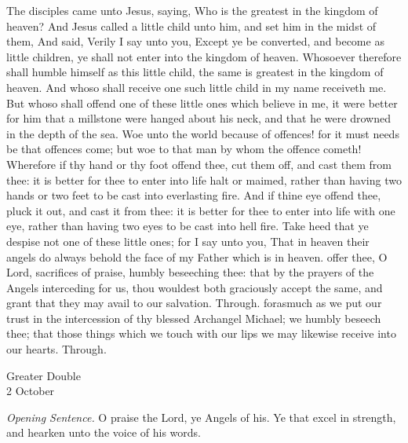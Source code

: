  The disciples came unto Jesus, saying, Who is the greatest in the kingdom of heaven? And Jesus called a little child unto him, and set him in the midst of them, And said, Verily I say unto you, Except ye be converted, and become as little children, ye shall not enter into the kingdom of heaven. Whosoever therefore shall humble himself as this little child, the same is greatest in the kingdom of heaven. And whoso shall receive one such little child in my name receiveth me. But whoso shall offend one of these little ones which believe in me, it were better for him that a millstone were hanged about his neck, and that he were drowned in the depth of the sea. Woe unto the world because of offences! for it must needs be that offences come; but woe to that man by whom the offence cometh! Wherefore if thy hand or thy foot offend thee, cut them off, and cast them from thee: it is better for thee to enter into life halt or maimed, rather than having two hands or two feet to be cast into everlasting fire. And if thine eye offend thee, pluck it out, and cast it from thee: it is better for thee to enter into life with one eye, rather than having two eyes to be cast into hell fire. Take heed that ye despise not one of these little ones; for I say unto you, That in heaven their angels do always behold the face of my Father which is in heaven.
\secret
{} offer thee, O Lord, sacrifices of praise, humbly beseeching thee: that by the prayers of the Angels interceding for us, thou wouldest both graciously accept the same, and grant that they may avail to our salvation. Through.
\postcommunion
{} forasmuch as we put our trust in the intercession of thy blessed Archangel Michael; we humbly beseech thee; that those things which we touch with our lips we may likewise receive into our hearts. Through.


\begin{inhead}
	{Greater Double\\
		2 October}
\end{inhead}
\par\noindent
\textit{Opening Sentence.} O praise the Lord, ye Angels of his. Ye that excel in strength, and hearken unto the voice of his words.
\par\noindent
{}
\par\noindent
{}
\par\noindent
{}

